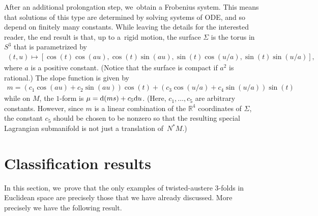\documentclass[10pt,a4paper]{amsart}
\def\R{\mathbb{R}}
\numberwithin{equation}{section}
\begin{document}
After an additional prolongation step, we~obtain a Frobenius system. This means that solutions of this type are determined by solving systems of ODE, and so depend on finitely many constants. While leaving the details for the interested reader, the end result is that, up to a~rigid motion, the surface $\Sigma$ is the torus in $S^3$ that is parametrized by
\begin{gather*}
(t,u) \mapsto [\cos(t) \cos(au), \cos(t)\sin(au), \sin(t) \cos(u/a), \sin(t)\sin(u/a)],
\end{gather*}
where $a$ is a positive constant. (Notice that the surface is compact if $a^2$ is rational.) The slope function is given by
\begin{gather*}
m = (c_1 \cos(au)+ c_2 \sin(au)) \cos(t) + (c_3 \cos(u/a) +c_4 \sin(u/a)) \sin(t)
\end{gather*}
while on $M$, the $1$-form is $\mu = {\rm d}(ms) + c_5 {\rm d}u$. (Here, $c_1, \dots, c_5$ are arbitrary constants. However, since $m$ is a linear combination of the $\R^4$ coordinates of $\Sigma$, the constant $c_5$ should be chosen to be nonzero so that the resulting special Lagrangian submanifold is not just a translation of~$N^* M$.)

\section{Classification results} \label{sec:classification}

In this section, we~prove that the only examples of twisted-austere 3-folds in Euclidean space are precisely those that we have already discussed. More precisely we have the following result.
\end{document}
